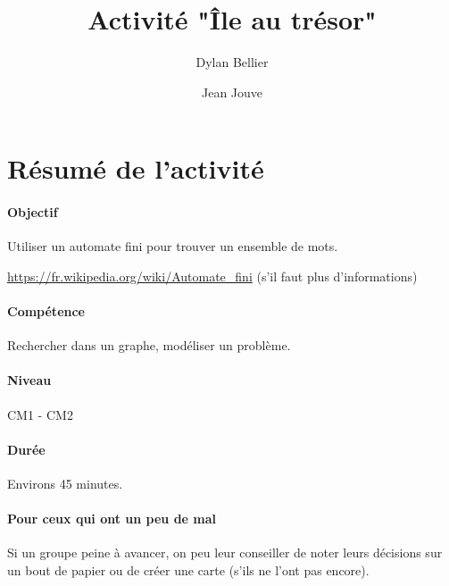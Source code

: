\documentclass[a4paper,11pt]{article}%
\title{Activité "Île au trésor"}%
\author{Dylan Bellier \and Jean Jouve}%
\date{}%
\begin{document}
%

\maketitle%

\section{Résumé de l'activité}

\paragraph{Objectif}
Utiliser un automate fini pour trouver un ensemble de mots.

\url{https://fr.wikipedia.org/wiki/Automate_fini} (s'il faut plus 
d'informations)

\paragraph{Compétence}
Rechercher dans un graphe, modéliser un problème.

\paragraph{Niveau}
CM1 - CM2


\paragraph{Durée}
Environs 45 minutes.

\paragraph{Pour ceux qui ont un peu de mal}
  Si un groupe peine à avancer, on peu leur conseiller de noter leurs décisions 
  sur un bout de papier ou de créer une carte (s'ils ne l'ont pas encore).
\end{document}
